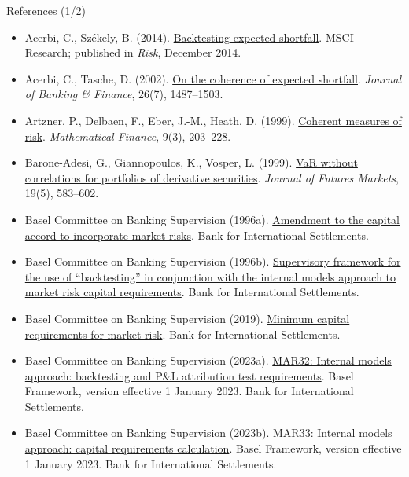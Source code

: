 \begin{frame}{References (1/2)}
\itemsize{\tiny}
\begin{itemize}
    \item Acerbi, C., Székely, B. (2014). \href{https://www.msci.com/documents/10199/22aa9922-f874-4060-b77a-0f0e267a489b}{Backtesting expected shortfall}. MSCI Research; published in \textit{Risk}, December 2014.
    \item Acerbi, C., Tasche, D. (2002). \href{https://doi.org/10.1016/S0378-4266(02)00283-2}{On the coherence of expected shortfall}. \textit{Journal of Banking \& Finance}, 26(7), 1487--1503.
    \item Artzner, P., Delbaen, F., Eber, J.-M., Heath, D. (1999). \href{https://doi.org/10.1111/1467-9965.00068}{Coherent measures of risk}. \textit{Mathematical Finance}, 9(3), 203--228.
    \item Barone-Adesi, G., Giannopoulos, K., Vosper, L. (1999). \href{https://doi.org/10.1002/(SICI)1096-9934(199908)19:5<583::AID-FUT5>3.0.CO;2-S}{VaR without correlations for portfolios of derivative securities}. \textit{Journal of Futures Markets}, 19(5), 583--602.
    \item Basel Committee on Banking Supervision (1996a). \href{https://www.bis.org/publ/bcbs24.htm}{Amendment to the capital accord to incorporate market risks}. Bank for International Settlements.
    \item Basel Committee on Banking Supervision (1996b). \href{https://www.bis.org/publ/bcbs22.htm}{Supervisory framework for the use of ``backtesting'' in conjunction with the internal models approach to market risk capital requirements}. Bank for International Settlements.
    \item Basel Committee on Banking Supervision (2019). \href{https://www.bis.org/bcbs/publ/d457.htm}{Minimum capital requirements for market risk}. Bank for International Settlements.
    \item Basel Committee on Banking Supervision (2023a). \href{https://www.bis.org/basel_framework/chapter/MAR/32.htm}{MAR32: Internal models approach: backtesting and P\&L attribution test requirements}. Basel Framework, version effective 1 January 2023. Bank for International Settlements.
    \item Basel Committee on Banking Supervision (2023b). \href{https://www.bis.org/basel_framework/chapter/MAR/33.htm}{MAR33: Internal models approach: capital requirements calculation}. Basel Framework, version effective 1 January 2023. Bank for International Settlements.

\end{itemize}
\end{frame}
